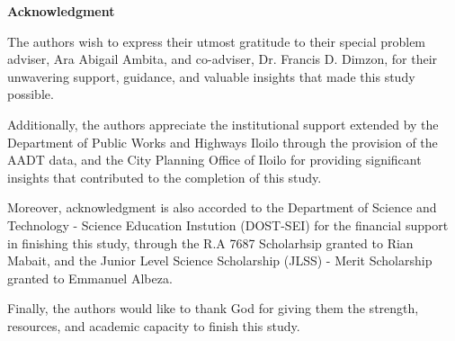\begin{center}
\textbf{Acknowledgment}
\end{center}

The authors wish to express their utmost gratitude to their special problem adviser, Ara Abigail Ambita, and co-adviser, Dr. Francis D. Dimzon, for their unwavering support, guidance, and valuable insights that made this study possible.

Additionally, the authors appreciate the institutional support extended by the Department of Public Works and Highways Iloilo through the provision of the AADT data, and the City Planning Office of Iloilo for providing significant insights that contributed to the completion of this study.

Moreover, acknowledgment is also accorded to the Department of Science and Technology - Science Education Instution (DOST-SEI) for the financial support in finishing this study, through the R.A 7687 Scholarhsip granted to Rian Mabait, and the Junior Level Science Scholarship (JLSS) - Merit Scholarship granted to Emmanuel Albeza.

Finally, the authors would like to thank God for giving them the strength, resources, and academic capacity to finish this study. 